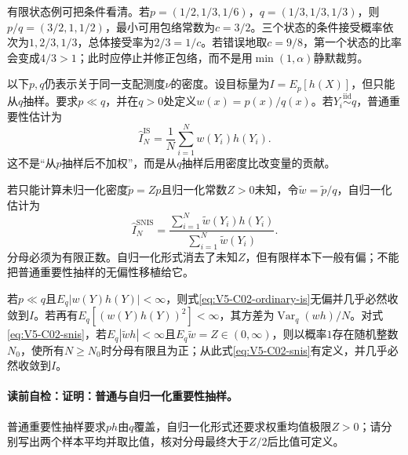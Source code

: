 有限状态例可把条件看清。若$p=(1/2,1/3,1/6)$，$q=(1/3,1/3,1/3)$，则$p/q=(3/2,1,1/2)$，最小可用包络常数为$c=3/2$。三个状态的条件接受概率依次为$1,2/3,1/3$，总体接受率为$2/3=1/c$。若错误地取$c=9/8$，第一个状态的比率会变成$4/3>1$；此时应停止并修正包络，而不是用$\min(1,\alpha)$静默裁剪。

以下$p,q$仍表示关于同一支配测度$\nu$的密度。设目标量为$I=E_p[h(X)]$，但只能从$q$抽样。要求$p\ll q$，并在$q>0$处定义$w(x)=p(x)/q(x)$。若$Y_i\stackrel{\mathrm{iid}}{\sim}q$，普通重要性估计为
\begin{equation}\label{eq:V5-C02-ordinary-is}
\widehat I_N^{\mathrm{IS}}=\frac1N\sum_{i=1}^Nw(Y_i)h(Y_i).
\end{equation}
这不是“从$p$抽样后不加权”，而是从$q$抽样后用密度比改变量的贡献。

若只能计算未归一化密度$\widetilde p=Zp$且归一化常数$Z>0$未知，令$\widetilde w=\widetilde p/q$，自归一化估计为
\begin{equation}\label{eq:V5-C02-snis}
\widehat I_N^{\mathrm{SNIS}}
=\frac{\sum_{i=1}^N\widetilde w(Y_i)h(Y_i)}
{\sum_{i=1}^N\widetilde w(Y_i)}.
\end{equation}
分母必须为有限正数。自归一化形式消去了未知$Z$，但有限样本下一般有偏；不能把普通重要性抽样的无偏性移植给它。

\begin{theorem}[普通与自归一化重要性抽样]\label{thm:V5-C02-is-properties}
若$p\ll q$且$E_q|w(Y)h(Y)|<\infty$，则式\eqref{eq:V5-C02-ordinary-is}无偏并几乎必然收敛到$I$。若再有$E_q[(w(Y)h(Y))^2]<\infty$，其方差为$\operatorname{Var}_q(wh)/N$。对式\eqref{eq:V5-C02-snis}，若$E_q|\widetilde w h|<\infty$且$E_q\widetilde w=Z\in(0,\infty)$，则以概率$1$存在随机整数$N_0$，使所有$N\ge N_0$时分母有限且为正；从此式\eqref{eq:V5-C02-snis}有定义，并几乎必然收敛到$I$。
\end{theorem}
\paragraph{读前自检：证明：普通与自归一化重要性抽样。}普通重要性抽样要求$p h$由$q$覆盖，自归一化形式还要求权重均值极限$Z>0$；请分别写出两个样本平均并取比值，核对分母最终大于$Z/2$后比值可定义。\par

